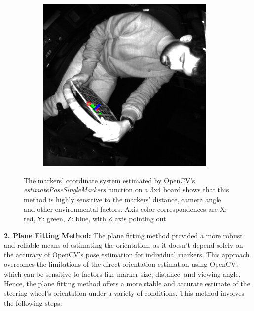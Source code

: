 \begin{figure}[htpb]
\begin{subfigure}[t]{0.23\textwidth}
    \end{subfigure}\hfill
    \begin{subfigure}[t]{0.23\textwidth}
        \centering
        \includegraphics[width=\textwidth]{media/chapter 5/aruco_board_estimation3.png}
    \end{subfigure}
    \caption{The markers' coordinate system estimated by OpenCV's
            \emph{estimatePoseSingleMarkers} function on a 3x4
            board shows that this method is highly sensitive
            to the markers' distance, camera angle and other
            environmental factors. Axis-color correspondences are 
            X: red, Y: green, Z: blue, with Z axis pointing out}
    \label{fig:estimatePoseSingleMarkers}
\end{figure}

\textbf{2. Plane Fitting Method: }
The plane fitting method provided a more robust and reliable 
means of estimating the orientation, as it doesn't depend solely 
on the accuracy of OpenCV's pose estimation for individual 
markers. This approach overcomes the limitations of the direct 
orientation estimation using OpenCV, which can be sensitive to 
factors like marker size, distance, and viewing angle. 
Hence, the plane fitting method offers a more stable and 
accurate estimate of the steering wheel's orientation under a 
variety of conditions.
This method involves the following steps:

